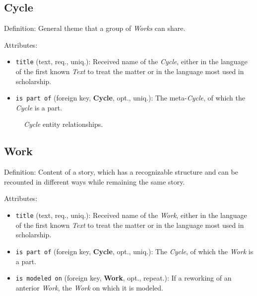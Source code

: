 \subsection{Cycle}

Definition: General theme that a group of \textit{Works} can share.  

\vspace{1em}
\noindent Attributes:
\begin{itemize}
    \item \texttt{title} (text, req., uniq.): Received name of the \textit{Cycle}, either in the language of the first known \textit{Text} to treat the matter or in the language most used in scholarship.
    \item \texttt{is part of} (foreign key, \textbf{Cycle}, opt., uniq.): The meta-\textit{Cycle}, of which the \textit{Cycle} is a part.
\end{itemize}

\begin{figure}[ht]
    \begin{center}
        
    \end{center}
\label{fig:CycleER}
\caption{\textit{Cycle} entity relationships.}
\end{figure}


\subsection{Work}

Definition: Content of a story, which has a recognizable structure and can be recounted in different ways while remaining the same story.

\vspace{1em}
\noindent Attributes:
\begin{itemize}
    \item \texttt{title} (text, req., uniq.): Received name of the \textit{Work}, either in the language of the first known \textit{Text} to treat the matter or in the language most used in scholarship.
    \item \texttt{is part of} (foreign key, \textbf{Cycle}, opt., uniq.): The \textit{Cycle}, of which the \textit{Work} is a part.
    \item \texttt{is modeled on} (foreign key, \textbf{Work}, opt., repeat.): If a reworking of an anterior \textit{Work}, the \textit{Work} on which it is modeled.
\end{itemize}


